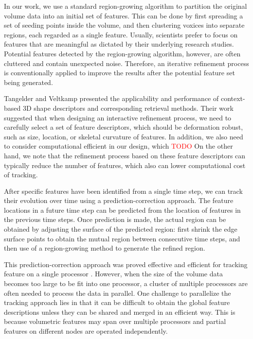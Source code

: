 \documentclass[10pt, conference, compsocconf]{IEEEtran}
\begin{document}
In our work, we use a standard region-growing algorithm \cite{Huang2003} to partition the original volume data into an initial set of features. This can be done by first spreading a set of seeding points inside the volume, and then clustering voxices into separate regions, each regarded as a single feature. Usually, scientists prefer to focus on features that are meaningful as dictated by their underlying research studies. Potential features detected by the region-growing algorithm, however, are often cluttered and contain unexpected noise. Therefore, an iterative refinement process is conventionally applied to improve the results after the potential feature set being generated. 

Tangelder and Veltkamp \cite{Schlemmer2007} presented the applicability and performance of context-based 3D shape descriptors and corresponding retrieval methods. Their work suggested that when designing an interactive refinement process, we need to carefully select a set of feature descriptors, which should be deformation robust, such as size, location, or skeletal curvature of features. In addition, we also need to consider computational efficient in our design, which \textcolor{red}{TODO}
On the other hand, we note that the refinement process based on these feature descriptors can typically reduce the number of features, which also can lower computational cost of tracking.

After specific features have been identified from a single time step, we can track their evolution over time using a prediction-correction approach. The feature locations in a future time step can be predicted from the location of features in the previous time steps. Once prediction is made, the actual region can be obtained by adjusting the surface of the predicted region: first shrink the edge surface points to obtain the mutual region between consecutive time steps, and then use of a region-growing method to generate the refined region.

This prediction-correction approach was proved effective and efficient for tracking feature on a single processor \cite{Muelder2009}. However, when the size of the volume data becomes too large to be fit into one processor, a cluster of multiple processors are often needed to process the data in parallel. One challenge to parallelize the tracking approach lies in that it can be difficult to obtain the global feature descriptions unless they can be shared and merged in an efficient way. This is because volumetric features may span over multiple processors and partial features on different nodes are operated independently.
\end{document}
